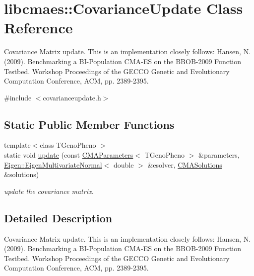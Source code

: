\hypertarget{classlibcmaes_1_1CovarianceUpdate}{\section{libcmaes\-:\-:Covariance\-Update Class Reference}
\label{classlibcmaes_1_1CovarianceUpdate}
}


Covariance Matrix update. This is an implementation closely follows\-: Hansen, N. (2009). Benchmarking a B\-I-\/\-Population C\-M\-A-\/\-E\-S on the B\-B\-O\-B-\/2009 Function Testbed. Workshop Proceedings of the G\-E\-C\-C\-O Genetic and Evolutionary Computation Conference, A\-C\-M, pp. 2389-\/2395.  




{\ttfamily \#include $<$covarianceupdate.\-h$>$}

\subsection*{Static Public Member Functions}
\begin{DoxyCompactItemize}
\item 
{\footnotesize template$<$class T\-Geno\-Pheno $>$ }\\static void \hyperlink{classlibcmaes_1_1CovarianceUpdate_a39f58b771690547822ad54b8e89201cd}{update} (const \hyperlink{classlibcmaes_1_1CMAParameters}{C\-M\-A\-Parameters}$<$ T\-Geno\-Pheno $>$ \&parameters, \hyperlink{classEigen_1_1EigenMultivariateNormal}{Eigen\-::\-Eigen\-Multivariate\-Normal}$<$ double $>$ \&esolver, \hyperlink{classlibcmaes_1_1CMASolutions}{C\-M\-A\-Solutions} \&solutions)
\begin{DoxyCompactList}\small\item\em update the covariance matrix. \end{DoxyCompactList}\end{DoxyCompactItemize}


\subsection{Detailed Description}
Covariance Matrix update. This is an implementation closely follows\-: Hansen, N. (2009). Benchmarking a B\-I-\/\-Population C\-M\-A-\/\-E\-S on the B\-B\-O\-B-\/2009 Function Testbed. Workshop Proceedings of the G\-E\-C\-C\-O Genetic and Evolutionary Computation Conference, A\-C\-M, pp. 2389-\/2395. 

